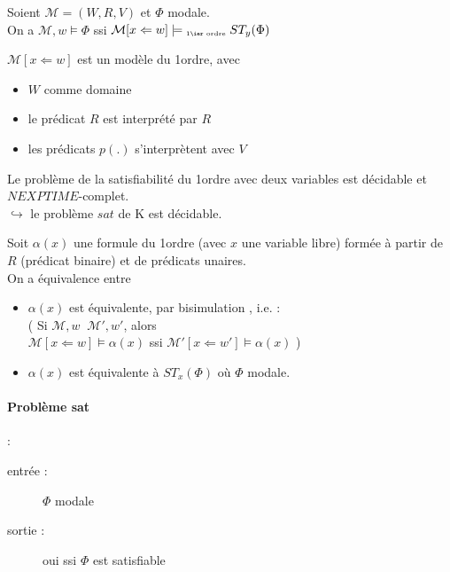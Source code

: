 \documentclass[10pt,a4paper]{article}
\newcommand{\M}{\mathcal{M}}
\DeclareMathOperator{\bisim}{\underline{\leftrightarrow}}
\begin{document}
\begin{prop}
 Soient $ \M = (W,R,V)$ et $ \Phi$ modale. \\
On a $ \M,w \models \Phi$ ssi $ \M [x \Leftarrow w] \models_{\text{ \tiny{1\ier ordre}}} ST_y( \Phi)$
\end{prop}
\begin{rem}
 $\M [x \Leftarrow w]$ est un modèle du 1\ier ordre, avec 
\begin{itemize}
 \item $W$ comme domaine 
 \item le prédicat $R$ est interprété par $R$
 \item les prédicats $p(.)$ s'interprètent avec $V$
\end{itemize}

\end{rem}

\begin{rem}
 Le problème de la satisfiabilité du 1\ier ordre avec deux variables est décidable et $NEXPTIME$-complet.\\
$ \hookrightarrow$ le problème $sat$ de K est décidable.
\end{rem}

\begin{thm}
 Soit $ \alpha(x)$ une formule du 1\ier ordre (avec $x$ une variable libre) formée à partir de $R$ (prédicat binaire) et de prédicats unaires.\\
On a équivalence entre
\begin{itemize}
 \item $ \alpha(x)$ est équivalente, par bisimulation , i.e. : \\
( Si $ \M,w \bisim \M', w'$, alors \\
$ \M [x \Leftarrow w] \models  \alpha(x)$ ssi $ \M' [x \Leftarrow w'] \models  \alpha(x)$ )
\item $ \alpha(x)$ est équivalente à $ST_x( \Phi)$ où $ \Phi$ modale.
\end{itemize}
\end{thm}

\paragraph{Problème sat}:
\begin{description}
 \item[entrée : ] $ \Phi $ modale
 \item[sortie : ]oui ssi $ \Phi $ est satisfiable
\end{description}
\end{document}
